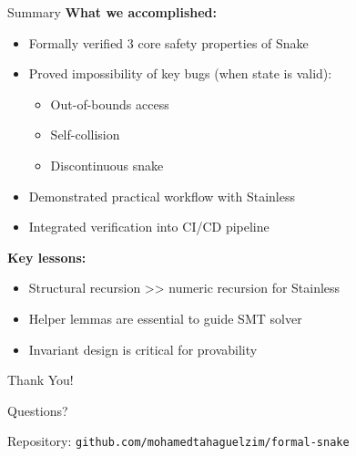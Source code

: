 \documentclass{beamer}
\begin{document}
\begin{frame}{Summary}
\textbf{What we accomplished:}
\begin{itemize}
  \item Formally verified 3 core safety properties of Snake
  \item Proved impossibility of key bugs (when state is valid):
  \begin{itemize}
    \item Out-of-bounds access
    \item Self-collision
    \item Discontinuous snake
  \end{itemize}
  \item Demonstrated practical workflow with Stainless
  \item Integrated verification into CI/CD pipeline
\end{itemize}

\vspace{0.5cm}
\textbf{Key lessons:}
\begin{itemize}
  \item Structural recursion >> numeric recursion for Stainless
  \item Helper lemmas are essential to guide SMT solver
  \item Invariant design is critical for provability
\end{itemize}
\end{frame}

\begin{frame}
\centering
\Huge Thank You!

\vspace{1cm}
\Large Questions?

\vspace{1cm}
\normalsize
Repository: \texttt{github.com/mohamedtahaguelzim/formal-snake}
\end{frame}
\end{document}
